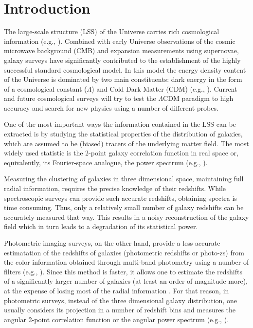 \documentclass[a4paper,fleqn,usenatbib]{mnras}
\begin{document}


\section{Introduction}
\label{sec: Intro}


The large-scale structure (LSS) of the Universe carries rich cosmological information (e.g., \citealt{Dodelson2013}). Combined with early Universe observations of the cosmic microwave background (CMB) and expansion measurements using supernovae, galaxy surveys have significantly contributed to the establishment of the highly successful standard cosmological model. In this model the energy density content of the Universe is dominated by two main constituents: dark energy in the form of a cosmological constant ($\Lambda$) \citep{Frieman2008,Amendola2010}  and Cold Dark Matter (CDM) (e.g., \citealt{Bertone2005,Bertone2016}). Current and future cosmological surveys will try to test the $\Lambda$CDM paradigm to high accuracy and search for new physics using a number of different probes.

One of the most important ways the information contained in the LSS can be extracted is by studying the statistical properties of the distribution of galaxies, which are assumed to be (biased) tracers of the underlying matter field. The most widely used statistic is the 2-point galaxy correlation function in real space or, equivalently, its Fourier-space analogue, the power spectrum (e.g., \citealt{Baugh2000}).

Measuring the clustering of galaxies in three dimensional space, maintaining full radial information, requires the precise knowledge of their redshifts. While spectroscopic surveys can provide such accurate redshifts,  obtaining spectra is time consuming. Thus, only a relatively small number of galaxy redshifts  can be accurately measured that way. This results in a noisy reconstruction of the galaxy field which in turn leads to a degradation of its statistical power. 

Photometric imaging surveys, on the other hand, provide a less accurate estimatation of the redshifts of galaxies (photometric redshifts or photo-zs) from the color information obtained through multi-band photometry using a number of filters (e.g., \citealt{Salvato2019}). Since this method is faster, it allows one to estimate the redshifts of a significantly larger number of galaxies (at least an order of magnitude more), at the expense of losing most of the radial information \citep{Benitez2009,Asorey2012,Chaves2018}. For that reason, in photometric surveys, instead of the three dimensional galaxy distribution, one usually considers its projection in a number of redshift bins and measures the angular 2-point correlation function or the angular power spectrum (e.g., \citealt{Crocce2011, Asorey2016, Budav, Elvin_Poole2018}).  
\end{document}
